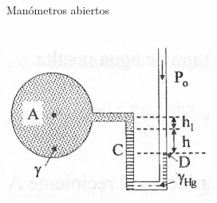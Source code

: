 \documentclass [xcolor=svgnames, t] {beamer}
\begin{document}
\begin{frame}{Man\'ometros abiertos}
\begin{itemize}
\begin{columns}
\begin{textblock*}{4.5cm}
\includegraphics[width=\textwidth]{mano218}
\end{textblock*}
\end{columns}
\end{itemize}
\end{frame}
\end{document}
